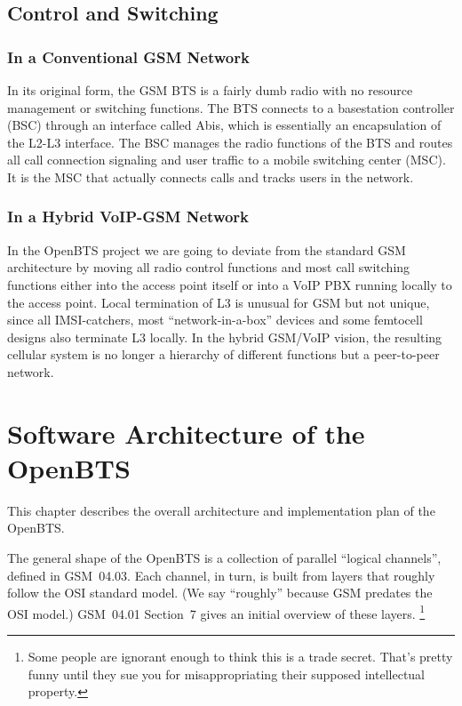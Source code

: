 \documentclass[11pt]{book}
\begin{document}
\section{Control and Switching}

\subsection{In a Conventional GSM Network}
In its original form, the GSM BTS is a fairly dumb radio with no resource management or switching functions. The BTS connects to a basestation controller (BSC) through an interface called Abis, which is essentially an encapsulation of the L2-L3 interface. The BSC manages the radio functions of the BTS and routes all call connection signaling and user traffic to a mobile switching center (MSC). It is the MSC that actually connects calls and tracks users in the network.

\subsection{In a Hybrid VoIP-GSM Network}
In the OpenBTS project we are going to deviate from the standard GSM architecture by moving all radio control functions and most call switching functions either into the access point itself or into a VoIP PBX running locally to the access point.  Local termination of L3 is unusual for GSM but not unique, since all IMSI-catchers, most ``network-in-a-box'' devices and some femtocell designs also terminate L3 locally.  In the hybrid GSM/VoIP vision, the resulting cellular system is no longer a hierarchy of different functions but a peer-to-peer network.



\chapter{Software Architecture of the OpenBTS}
This chapter describes the overall architecture and implementation plan of the OpenBTS.

The general shape of the OpenBTS is a collection of parallel ``logical channels'', defined in GSM~04.03.  Each channel, in turn, is built from layers that roughly follow the OSI standard model.  (We say ``roughly'' because GSM predates the OSI model.) GSM~04.01 Section~7 gives an initial overview of these layers.%
\footnote{Some people are ignorant enough to think this is a trade secret.  That's pretty funny until they sue you for misappropriating their supposed intellectual property.}
\end{document}
